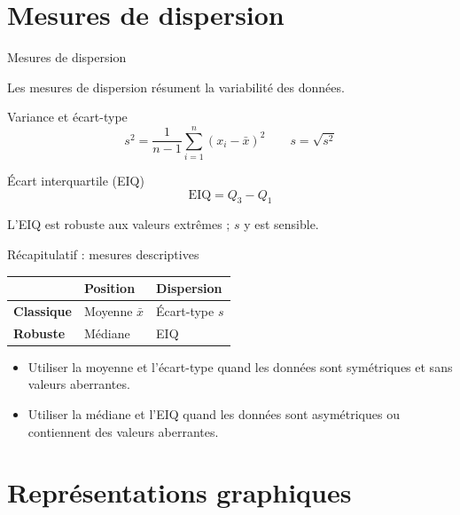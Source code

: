 \documentclass{BeamerTemplate}
\begin{document}
\section{Mesures de dispersion}

\begin{frame}[t]{Mesures de dispersion}

Les mesures de dispersion résument la \alert{variabilité} des données.

\bigskip
\begin{Boite}{Variance et écart-type}
$$s^2 = \frac{1}{n-1}\sum_{i=1}^{n}(x_i - \bar{x})^2 \qquad s = \sqrt{s^2}$$
\end{Boite}

\begin{Boite}{Écart interquartile (EIQ)}
$$\text{EIQ} = Q_3 - Q_1$$
\end{Boite}

\medskip
L'EIQ est robuste aux valeurs extrêmes ; $s$ y est sensible.

\end{frame}

\begin{frame}[t]{Récapitulatif : mesures descriptives}

\begin{center}
\begin{tabular}{lll}\hline
 & \textbf{Position} & \textbf{Dispersion} \\ \hline
\textbf{Classique} & Moyenne $\bar{x}$ & Écart-type $s$ \\[3pt]
\textbf{Robuste} & Médiane & EIQ \\ \hline
\end{tabular}
\end{center}

\bigskip
\begin{itemize}\itemsep5mm
  \item Utiliser la moyenne et l'écart-type quand les données sont \alert{symétriques} et sans valeurs aberrantes.
  \item Utiliser la médiane et l'EIQ quand les données sont \alert{asymétriques} ou contiennent des valeurs aberrantes.
\end{itemize}

\end{frame}

\section{Représentations graphiques}
\end{document}
